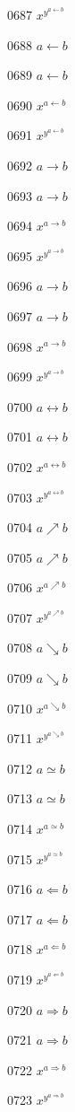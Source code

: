 \documentclass{article}
\begin{document}
0687 $x^{y^{a\gets b}}$\par
0688 $a\leftarrow b$\par
0689 $\displaystyle a\leftarrow b$\par
0690 $x^{a\leftarrow b}$\par
0691 $x^{y^{a\leftarrow b}}$\par
0692 $a\rightarrow b$\par
0693 $\displaystyle a\rightarrow b$\par
0694 $x^{a\rightarrow b}$\par
0695 $x^{y^{a\rightarrow b}}$\par
0696 $a\to b$\par
0697 $\displaystyle a\to b$\par
0698 $x^{a\to b}$\par
0699 $x^{y^{a\to b}}$\par
0700 $a\leftrightarrow b$\par
0701 $\displaystyle a\leftrightarrow b$\par
0702 $x^{a\leftrightarrow b}$\par
0703 $x^{y^{a\leftrightarrow b}}$\par
0704 $a\nearrow b$\par
0705 $\displaystyle a\nearrow b$\par
0706 $x^{a\nearrow b}$\par
0707 $x^{y^{a\nearrow b}}$\par
0708 $a\searrow b$\par
0709 $\displaystyle a\searrow b$\par
0710 $x^{a\searrow b}$\par
0711 $x^{y^{a\searrow b}}$\par
0712 $a\simeq b$\par
0713 $\displaystyle a\simeq b$\par
0714 $x^{a\simeq b}$\par
0715 $x^{y^{a\simeq b}}$\par
0716 $a\Leftarrow b$\par
0717 $\displaystyle a\Leftarrow b$\par
0718 $x^{a\Leftarrow b}$\par
0719 $x^{y^{a\Leftarrow b}}$\par
0720 $a\Rightarrow b$\par
0721 $\displaystyle a\Rightarrow b$\par
0722 $x^{a\Rightarrow b}$\par
0723 $x^{y^{a\Rightarrow b}}$\par
\end{document}
